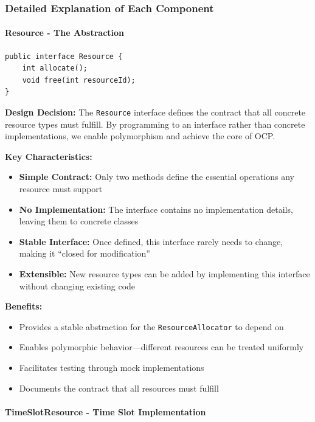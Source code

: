 \subsubsection{Detailed Explanation of Each Component}

\paragraph{Resource - The Abstraction}

\begin{verbatim}
public interface Resource {
    int allocate();
    void free(int resourceId);
}
\end{verbatim}

\textbf{Design Decision:} The \texttt{Resource} interface defines the contract that all concrete resource types must fulfill. By programming to an interface rather than concrete implementations, we enable polymorphism and achieve the core of OCP.

\textbf{Key Characteristics:}
\begin{itemize}
    \item \textbf{Simple Contract:} Only two methods define the essential operations any resource must support
    \item \textbf{No Implementation:} The interface contains no implementation details, leaving them to concrete classes
    \item \textbf{Stable Interface:} Once defined, this interface rarely needs to change, making it ``closed for modification''
    \item \textbf{Extensible:} New resource types can be added by implementing this interface without changing existing code
\end{itemize}

\textbf{Benefits:}
\begin{itemize}
    \item Provides a stable abstraction for the \texttt{ResourceAllocator} to depend on
    \item Enables polymorphic behavior—different resources can be treated uniformly
    \item Facilitates testing through mock implementations
    \item Documents the contract that all resources must fulfill
\end{itemize}

\paragraph{TimeSlotResource - Time Slot Implementation}

